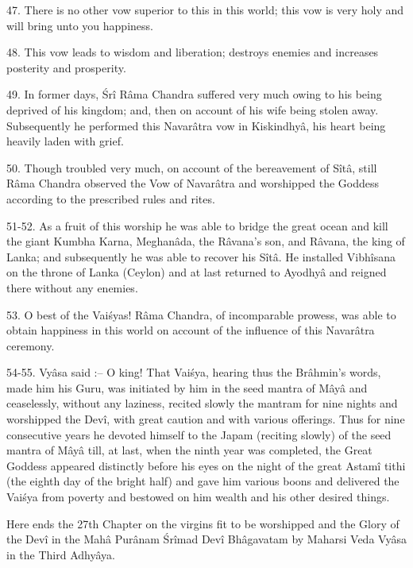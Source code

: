 47. There is no other vow superior to this in this world; this vow is very holy and will bring unto you happiness.

48. This vow leads to wisdom and liberation; destroys enemies and increases posterity and prosperity.

49. In former days, \'Sr\^i R\^ama Chandra suffered very much owing to his being deprived of his kingdom; and, then on account of his wife being stolen away. Subsequently he performed this Navar\^atra vow in Kiskindhy\^a, his heart being heavily laden with grief.

50. Though troubled very much, on account of the bereavement of S\^it\^a, still R\^ama Chandra observed the Vow of Navar\^atra and worshipped the Goddess according to the prescribed rules and rites.

51-52. As a fruit of this worship he was able to bridge the great ocean and kill the giant Kumbha Karna, Meghan\^ada, the R\^avana's son, and R\^avana, the king of Lanka; and subsequently he was able to recover his S\^it\^a. He installed Vibh\^isana on the throne of Lanka (Ceylon) and at last returned to Ayodhy\^a and reigned there without any enemies.

53. O best of the Vai\'syas! R\^ama Chandra, of incomparable prowess, was able to obtain happiness in this world on account of the influence of this Navar\^atra ceremony.

54-55. Vy\^asa said :-- O king! That Vai\'sya, hearing thus the Br\^ahmin's words, made him his Guru, was initiated by him in the seed mantra of M\^ay\^a and ceaselessly, without any laziness, recited slowly the mantram for nine nights and worshipped the Dev\^i, with great caution and with various offerings. Thus for nine consecutive years he devoted himself to the Japam (reciting slowly) of the seed mantra of M\^ay\^a till, at last, when the ninth year was completed, the Great Goddess appeared distinctly before his eyes on the night of the great Astam\^i tithi (the eighth day of the bright half) and gave him various boons and delivered the Vai\'sya from poverty and bestowed on him wealth and his other desired things.

Here ends the 27th Chapter on the virgins fit to be worshipped and the Glory of the Dev\^i in the Mah\^a Pur\^anam \'Sr\^imad Dev\^i Bh\^agavatam by Maharsi Veda Vy\^asa in the Third Adhy\^aya.